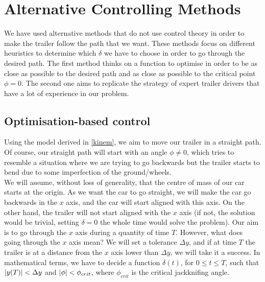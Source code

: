 


\section{Alternative Controlling Methods}

We have used alternative methods that do not use control theory in order to make the trailer follow the path that we want. These methods focus on different heuristics to determine which $\delta$ we have to choose in order to go through the desired path. The first method thinks on a function to optimise in order to be as close as possible to the desired path and as close as possible to the critical point $\phi = 0$. The second one aims to replicate the strategy of expert trailer drivers that have a lot of experience in our problem.\\

\subsection{Optimisation-based control}

Using the model derived in \cref{kinem}, we aim to move our trailer in a straight path. Of course, our straight path will start with an angle $\phi \neq 0$, which tries to resemble a situation where we are trying to go backwards but the trailer starts to bend due to some imperfection of the ground/wheels.\\

We will assume, without loss of generality, that the centre of mass of our car starts at the origin. As we want the car to go straight, we will make the car go backwards in the $x$ axis, and the car will start aligned with this axis. On the other hand, the trailer will not start aligned with the $x$ axis (if not, the solution would be trivial, setting $\delta = 0$ the whole time would solve the problem). Our aim is to go through the $x$ axis during a quantity of time $T$. However, what does going through the $x$ axis mean?
We will set a tolerance $\Delta y$, and if at time $T$ the trailer is at a distance from the $x$ axis lower than $\Delta y$, we will take it a success. In mathematical terms, we have to decide a function $\delta(t)$, for $0\leq t \leq T$, such that $\abs{y(T)} < \Delta y$ and $\abs{\phi} < \phi_{crit}$, where $\phi_{crit}$ is the critical jackknifing angle.\\

